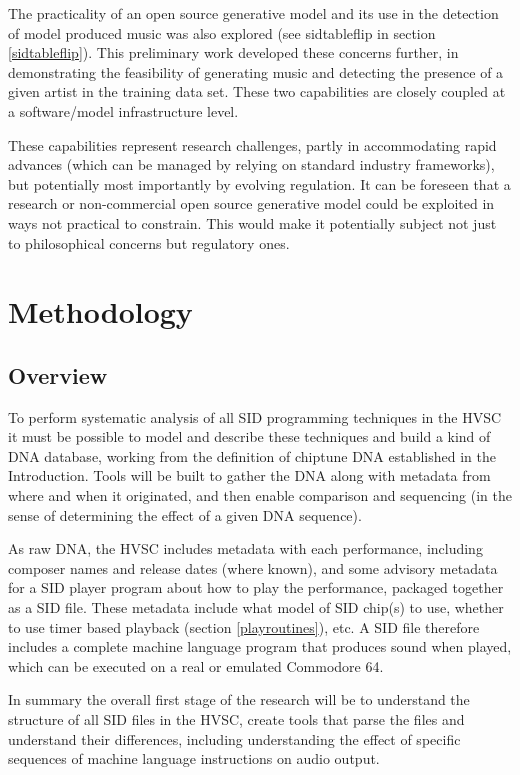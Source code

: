 \documentclass[10pt]{article}
\begin{document}
\begin{multicols*}{2}
The practicality of an open source generative model and its use in the detection of model produced music was also explored (see sidtableflip in section \ref{sidtableflip}). This preliminary work developed these concerns further, in demonstrating the feasibility of generating music and detecting the presence of a given artist in the training data set. These two capabilities are closely coupled at a software/model infrastructure level.

These capabilities represent research challenges, partly in accommodating rapid advances (which can be managed by relying on standard industry frameworks), but potentially most importantly by evolving regulation. It can be foreseen that a research or non-commercial open source generative model could be exploited in ways not practical to constrain. This would make it potentially subject not just to philosophical concerns but regulatory ones.

\section{Methodology}
\label{methodology}

    \subsection{Overview}

To perform systematic analysis of all SID programming techniques in the HVSC it must be possible to model and describe these techniques and build a kind of DNA database, working from the definition of chiptune DNA established in the Introduction. Tools will be built to gather the DNA along with metadata from where and when it originated, and then enable comparison and sequencing (in the sense of determining the effect of a given DNA sequence).

As raw DNA, the HVSC includes metadata with each performance, including composer names and release dates (where known), and some advisory metadata for a SID player program about how to play the performance, packaged together as a SID file\cite{sidfile}. These metadata include what model of SID chip(s) to use, whether to use timer based playback (section \ref{playroutines}), etc. A SID file therefore includes a complete machine language program that produces sound when played, which can be executed on a real or emulated Commodore 64.

In summary the overall first stage of the research will be to understand the structure of all SID files in the HVSC, create tools that parse the files and understand their differences, including understanding the effect of specific sequences of machine language instructions on audio output.


\end{multicols*}
\end{document}
